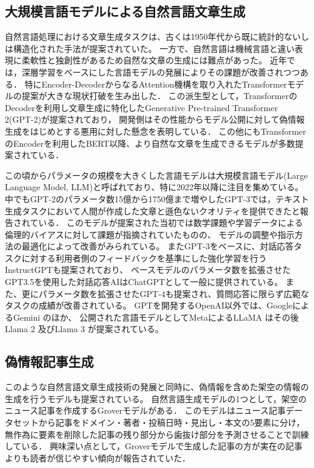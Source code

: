 \subsection{大規模言語モデルによる自然言語文章生成}
自然言語処理における文章生成タスクは、古くは1950年代から既に統計的ないしは構造化された手法\cite{Fine1998,10.1162/089120102762671972}が提案されていた。
一方で、自然言語は機械言語と違い表現に柔軟性と独創性があるため自然な文章の生成には難点があった。
近年では，深層学習をベースにした言語モデルの発展によりその課題が改善されつつある．
特にEncoder-DecoderからなるAttention機構を取り入れたTransformerモデルの提案\cite{NIPS2017_3f5ee243}が大きな現状打破を生み出した．
この派生型として，TransformerのDecoderを利用し文章生成に特化したGenerative Pre-trained Transformer 2(GPT-2)が提案\cite{Radford_GPT2}されており，
開発側はその性能からモデル公開に対して偽情報生成をはじめとする悪用に対した懸念を表明している\cite{solaiman_clark_brundage_2020}．
この他にもTransformerのEncoderを利用したBERT\cite{devlin2019bert}以降、より自然な文章を生成できるモデルが多数提案されている．

この頃からパラメータの規模を大きくした言語モデルは大規模言語モデル(Large Language Model, LLM)と呼ばれており、特に2022年以降に注目を集めている。 %
中でもGPT-2のパラメータ数15億から1750億まで増やしたGPT-3では，テキスト生成タスクにおいて人間が作成した文章と遜色ないクオリティを提供できたと報告されている\cite{brown2020language}．
このモデルが提案された当初では数学課題や学習データによる倫理的バイアスに対して課題が指摘されていた\cite{Floridi2020,Chan2023}ものの、
モデルの調整\cite{borchers-etal-2022-looking}や指示方法の最適化\cite{NEURIPS2022_8bb0d291,NEURIPS2022_9d560961}によって改善がみられている\cite{DBLP:conf/aied/AnLG23}。
またGPT-3をベースに、対話応答タスクに対する利用者側のフィードバックを基準にした強化学習を行うInstructGPTも提案されており\cite{NEURIPS2022_b1efde53}、
ベースモデルのパラメータ数を拡張させたGPT3.5を使用した対話応答AIはChatGPTとして一般に提供されている\cite{RAY2023121}。
また、更にパラメータ数を拡張させたGPT-4も提案され、質問応答に限らず広範なタスクの成績が改善されている\cite{openai2023gpt4}。
GPTを開発するOpenAI以外では、GoogleによるGemini \cite{geminiteam2024geminifamilyhighlycapable, geminiteam2024gemini15unlockingmultimodal}のほか、
公開された言語モデルとしてMetaによるLLaMA \cite{touvron2023llamaopenefficientfoundation}はその後 Llama 2 \cite{touvron2023llama2openfoundation} 及びLlama 3 \cite{dubey2024llama3herdmodels} が提案されている。


\subsection{偽情報記事生成}
\label{sec:generate}
このような自然言語文章生成技術の発展と同時に、偽情報を含めた架空の情報の生成を行うモデルも提案されている。
自然言語生成モデルの1つとして，架空のニュース記事を作成するGroverモデルがある\cite{DBLP:journals/corr/abs-1905-12616}．
このモデルはニュース記事データセットから記事をドメイン・著者・投稿日時・見出し・本文の5要素に分け，無作為に要素を削除した記事の残り部分から歯抜け部分を予測させることで訓練している．
興味深い点として，Groverモデルで生成した記事の方が実在の記事よりも読者が信じやすい傾向が報告されていた．

